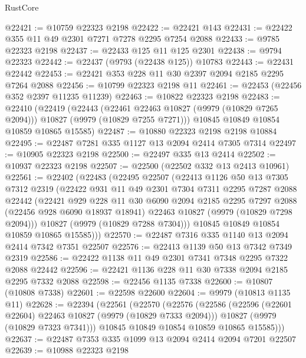 \begin{lexlean}{RustCore}
\begin{coremodule}
@22421 := @10759 @22323 @2198
@22422 := @22421 @143
@22431 := @22422 @355 @11 @49 @2301 @7271 @7278 @2295 @7254 @2088
@22433 := @9785 @22323 @2198
@22437 := @22433 @125 @11 @125 @2301
@22438 := @9794 @22323
@22442 := @22437 (@9793 (@22438 @125)) @10783
@22443 := @22431 @22442
@22453 := @22421 @353 @228 @11 @30 @2397 @2094 @2185 @2295 @7264 @2088
@22456 := @10799 @22323 @2198 @11
@22461 := @22453 (@22456 @352 @2397 @11235 @11239)
@22463 := @10822 @22323 @2198
@22483 := @22410
    (@22419
      (@22443
        (@22461 @22463 @10827 (@9979 (@10829 @7265 @2094)))
        @10827
        (@9979 (@10829 @7255 @7271)))
      @10845
      @10849
      @10854
      @10859
      @10865
      @15585)
@22487 := @10880 @22323 @2198 @2198 @10884
@22495 := @22487 @7281 @335 @1127 @13 @2094 @2414 @7305 @7314
@22497 := @10905 @22323 @2198
@22500 := @22497 @335 @13 @2414
@22502 := @10937 @22323 @2198
@22507 := @22500 (@22502 @332 @13 @2413 @10961)
@22561 := @22402
    (@22483
      (@22495
        @22507
        (@22413
          @1126
          @50
          @13
          @7305
          @7312
          @2319
          (@22422
            @931
            @11
            @49
            @2301
            @7304
            @7311
            @2295
            @7287
            @2088
            @22442
            (@22421
              @929
              @228
              @11
              @30
              @6090
              @2094
              @2185
              @2295
              @7297
              @2088
              (@22456 @928 @6090 @18937 @18941)
              @22463
              @10827
              (@9979 (@10829 @7298 @2094)))
            @10827
            (@9979 (@10829 @7288 @7304)))
          @10845
          @10849
          @10854
          @10859
          @10865
          @15585)))
@22570 := @22487 @7316 @335 @1140 @13 @2094 @2414 @7342 @7351 @22507
@22576 := @22413 @1139 @50 @13 @7342 @7349 @2319
@22586 := @22422 @1138 @11 @49 @2301 @7341 @7348 @2295 @7322 @2088 @22442
@22596 := @22421 @1136 @228 @11 @30 @7338 @2094 @2185 @2295 @7332 @2088
@22598 := @22456 @1135 @7338
@22600 := @10807 (@10808 @7338)
@22601 := @22598 @22600
@22604 := @9979 (@10813 @1135 @11)
@22628 := @22394
    (@22561
      (@22570
        (@22576
          (@22586
            (@22596 (@22601 @22604) @22463 @10827 (@9979 (@10829 @7333 @2094)))
            @10827
            (@9979 (@10829 @7323 @7341)))
          @10845
          @10849
          @10854
          @10859
          @10865
          @15585)))
@22637 := @22487 @7353 @335 @1099 @13 @2094 @2414 @2094 @7201 @22507
@22639 := @10988 @22323 @2198

\end{coremodule}
\end{lexlean}
